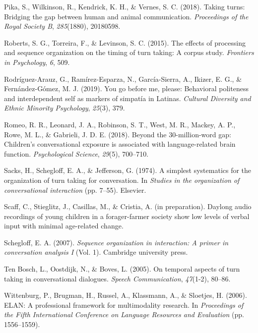 \documentclass[10pt, letterpaper]{article}
\newenvironment{CSLReferences}%
  {}%
  {\par}
\begin{document}
\begin{CSLReferences}
\leavevmode\hypertarget{ref-pika2018taking}{}%
Pika, S., Wilkinson, R., Kendrick, K. H., \& Vernes, S. C. (2018).
Taking turns: Bridging the gap between human and animal communication.
\emph{Proceedings of the Royal Society B}, \emph{285}(1880), 20180598.

\leavevmode\hypertarget{ref-roberts2015effects}{}%
Roberts, S. G., Torreira, F., \& Levinson, S. C. (2015). The effects of
processing and sequence organization on the timing of turn taking: A
corpus study. \emph{Frontiers in Psychology}, \emph{6}, 509.

\leavevmode\hypertarget{ref-rodriguez2019you}{}%
Rodríguez-Arauz, G., Ramírez-Esparza, N., García-Sierra, A., Ikizer, E.
G., \& Fernández-Gómez, M. J. (2019). You go before me, please:
Behavioral politeness and interdependent self as markers of simpatía in
{L}atinas. \emph{Cultural Diversity and Ethnic Minority Psychology},
\emph{25}(3), 379.

\leavevmode\hypertarget{ref-romeo2018beyond}{}%
Romeo, R. R., Leonard, J. A., Robinson, S. T., West, M. R., Mackey, A.
P., Rowe, M. L., \& Gabrieli, J. D. E. (2018). Beyond the
30-million-word gap: Children's conversational exposure is associated
with language-related brain function. \emph{Psychological Science},
\emph{29}(5), 700--710.

\leavevmode\hypertarget{ref-sacks1974simplest}{}%
Sacks, H., Schegloff, E. A., \& Jefferson, G. (1974). A simplest
systematics for the organization of turn taking for conversation. In
\emph{Studies in the organization of conversational interaction} (pp.
7--55). Elsevier.

\leavevmode\hypertarget{ref-scaffIPlanguage}{}%
Scaff, C., Stieglitz, J., Casillas, M., \& Cristia, A. (in preparation).
Daylong audio recordings of young children in a forager-farmer society
show low levels of verbal input with minimal age-related change.

\leavevmode\hypertarget{ref-schegloff2007sequence}{}%
Schegloff, E. A. (2007). \emph{Sequence organization in interaction: A
primer in conversation analysis {I}} (Vol. 1). Cambridge university
press.

\leavevmode\hypertarget{ref-ten2005temporal}{}%
Ten Bosch, L., Oostdijk, N., \& Boves, L. (2005). On temporal aspects of
turn taking in conversational dialogues. \emph{Speech Communication},
\emph{47}(1-2), 80--86.

\leavevmode\hypertarget{ref-ELAN}{}%
Wittenburg, P., Brugman, H., Russel, A., Klassmann, A., \& Sloetjes, H.
(2006). {ELAN}: A professional framework for multimodality research. In
\emph{{Proceedings of the Fifth International Conference on Language
Resources and Evaluation}} (pp. 1556--1559).

\end{CSLReferences}


\end{document}
